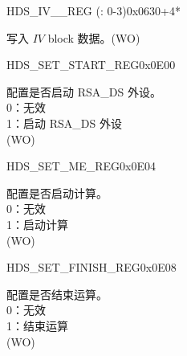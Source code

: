 


\begin{register}{H}{DS\_IV\_\_REG (: 0-3)}{0x0630+4*}
\label{regdesc:DSIVREG}
%
\regnewline%
\begin{regdesc}\begin{reglist}
\item [DS\_IV\_\regindex{m}\_REG] 写入 \begin{math}IV\end{math} block 数据。(WO)
\end{reglist}\end{regdesc}
\end{register}


\begin{register}{H}{DS\_SET\_START\_REG}{0x0E00}\label{regdesc:DSSETSTARTREG}
%
%
\regnewline%
\begin{regdesc}\begin{reglist}
\item [DS\_SET\_START] 配置是否启动 RSA\_DS 外设。\\
0：无效\\
1：启动 RSA\_DS 外设\\
(WO)
\end{reglist}\end{regdesc}
\end{register}


\begin{register}{H}{DS\_SET\_ME\_REG}{0x0E04}\label{regdesc:DSSETMEREG}
%
%
\regnewline%
\begin{regdesc}\begin{reglist}
\item [DS\_SET\_ME] 配置是否启动计算。\\
0：无效\\
1：启动计算\\
(WO)
\end{reglist}\end{regdesc}
\end{register}


\begin{register}{H}{DS\_SET\_FINISH\_REG}{0x0E08}\label{regdesc:DSSETFINISHREG}
%
%
\regnewline%
\begin{regdesc}\begin{reglist}
\item [DS\_SET\_FINISH] 配置是否结束运算。\\
0：无效\\
1：结束运算\\
(WO)
\end{reglist}\end{regdesc}
\end{register}



